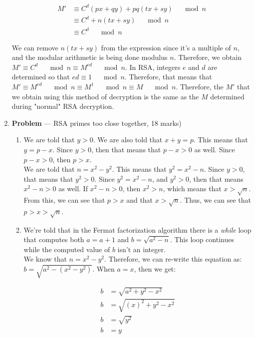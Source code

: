 \documentclass[11pt]{article}
\theoremstyle{definition}
\newcounter{problem}
\begin{document}
\begin{enumerate}
\begin{align*}
    M' &\equiv C^d(px + qy) + pq(tx + sy) \quad \mod{n} \\
    &\equiv C^d + n(tx + sy) \quad \mod{n} \\
    &\equiv C^d \quad \mod{n}
\end{align*}

We can remove $n(tx + sy)$ from the expression since it's a multiple of $n$, and the modular arithmetic is being done modulus $n$. Therefore, we obtain $M' \equiv C^d \quad \mod{n} \equiv M^{ed} \quad \mod{n}$. In RSA, integers $e$ and $d$ are determined so that $ed \equiv 1 \quad \mod{n}$. Therefore, that means that $M' \equiv M^{ed} \quad \mod{n} \equiv M^1 \quad \mod{n} \equiv M \quad \mod{n}$. Therefore, the $M'$ that we obtain using this method of decryption is the same as the $M$ determined during "normal" RSA decryption.

\newpage

\item[] \textbf{Problem \theproblem} ---  RSA primes too close together, 18 marks)


\begin{enumerate}
\item %
We are told that $y > 0$. We are also told that $x + y = p$. This means that $y = p - x$. Since $y > 0$, then that means that $p - x > 0$ as well. Since $p - x > 0$, then $p > x$. \\

We are told that $n = x^2 - y^2$. This means that $y^2 = x^2 - n$. Since $y > 0$, that means that $y^2 > 0$. Since $y^2 = x^2 - n$, and $y^2 > 0$, then that means $x^2 - n > 0$ as well. If $x^2 - n > 0$, then $x^2 > n$, which means that $x > \sqrt{n}$. \\

From this, we can see that $p > x$ and that $x > \sqrt{n}$. Thus, we can see that $p > x > \sqrt{n}$.


\item  %
We're told that in the Fermat factorization algorithm there is a \textit{while} loop that computes both $a = a + 1$ and $b = \sqrt{a^2 - n}$. This loop continues while the computed value of $b$ isn't an integer. \\

We know that $n = x^2 - y^2$. Therefore, we can re-write this equation as: $b = \sqrt{a^2 - (x^2 - y^2)}$. When $a = x$, then we get:

\begin{align*}
    b &= \sqrt{a^2 + y^2 - x^2} \\
    b &= \sqrt{(x)^2 + y^2 - x^2} \\
    b &= \sqrt{y^2} \\
    b &= y
\end{align*}


\end{enumerate}
\end{enumerate}
\end{document}
